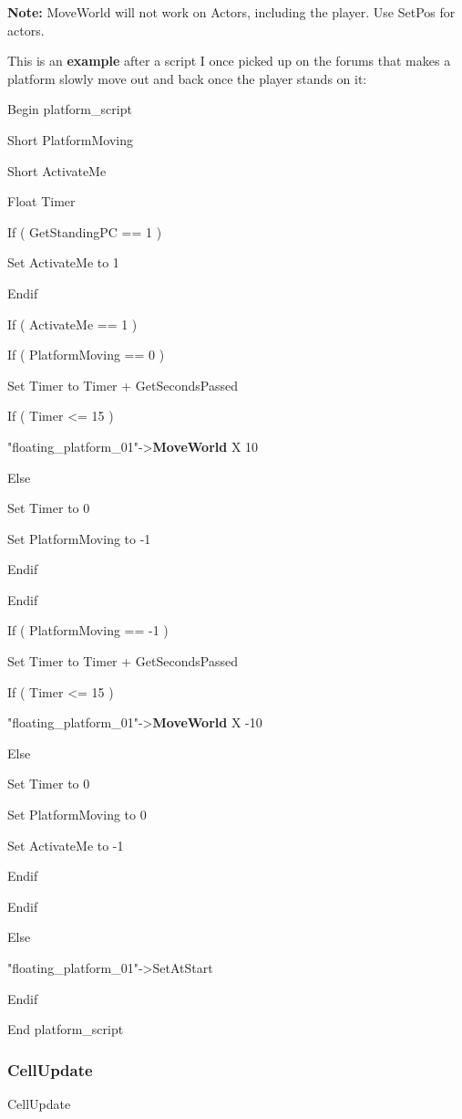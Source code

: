 \documentclass[
]{article}
\begin{document}
\textbf{Note:} MoveWorld will not work on Actors, including the player.
Use SetPos for actors.

This is an \textbf{example} after a script I once picked up on the
forums that makes a platform slowly move out and back once the player
stands on it:

Begin platform\_script

Short PlatformMoving

Short ActivateMe

Float Timer

If ( GetStandingPC == 1 )

Set ActivateMe to 1

Endif

If ( ActivateMe == 1 )

If ( PlatformMoving == 0 )

Set Timer to Timer + GetSecondsPassed

If ( Timer \textless= 15 )

"floating\_platform\_01"-\textgreater{}\textbf{MoveWorld} X 10

Else

Set Timer to 0

Set PlatformMoving to -1

Endif

Endif

If ( PlatformMoving == -1 )

Set Timer to Timer + GetSecondsPassed

If ( Timer \textless= 15 )

"floating\_platform\_01"-\textgreater{}\textbf{MoveWorld} X -10

Else

Set Timer to 0

Set PlatformMoving to 0

Set ActivateMe to -1

Endif

Endif

Else

"floating\_platform\_01"-\textgreater SetAtStart

Endif

End platform\_script

\hypertarget{cellupdate}{%
\subsubsection{CellUpdate}\label{cellupdate}}

CellUpdate
\end{document}
